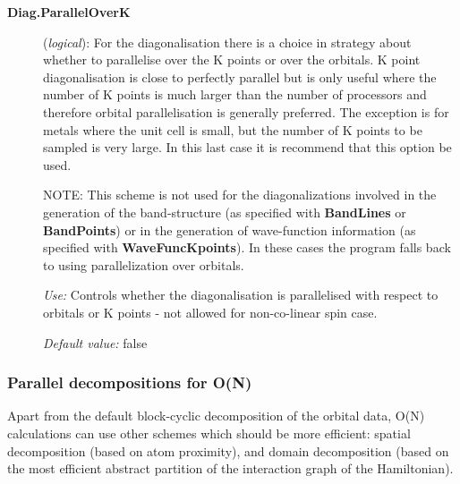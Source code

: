 \documentclass[11pt]{article}
\begin{document}
\begin{description}
\item[{\bf Diag.ParallelOverK}] ({\it logical}):  For the diagonalisation there is a choice in strategy
about whether to parallelise over the K points or over the orbitals. K
point diagonalisation is close to perfectly parallel but is only
useful where the number of K points is much larger than the number of
processors and therefore orbital parallelisation is generally
preferred. The exception is for metals where the unit cell is small,
but the number of K points to be sampled is very large. In this last
case it is recommend that this option be used.

NOTE: This scheme is not used for the diagonalizations involved in the
generation of the band-structure (as specified with {\bf BandLines} or
{\bf BandPoints}) or in the generation of wave-function information
(as specified with {\bf WaveFuncKpoints}). In these cases the program
falls back to using parallelization over orbitals.

{\it Use:} Controls whether the diagonalisation is parallelised with
respect to orbitals or K points - not allowed for non-co-linear spin
case.

{\it Default value:}  false

\end{description}

\subsubsection{Parallel decompositions for O(N)}
\label{parallel-on}

Apart from the default block-cyclic decomposition of the orbital data,
O(N) calculations can use other schemes which should be more
efficient: spatial decomposition (based on atom proximity), and domain
decomposition (based on the most efficient abstract partition of the
interaction graph of the Hamiltonian). 
\end{document}
